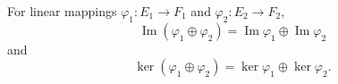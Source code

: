 For linear mappings $\varphi_1: E_1 \to F_1$ and $\varphi_2: E_2 \to F_2$,
$$\operatorname{Im}(\varphi_1 \oplus \varphi_2) = \operatorname{Im} \varphi_1 \oplus \operatorname{Im} \varphi_2$$
and
$$\ker(\varphi_1 \oplus \varphi_2) = \ker \varphi_1 \oplus \ker \varphi_2.$$
